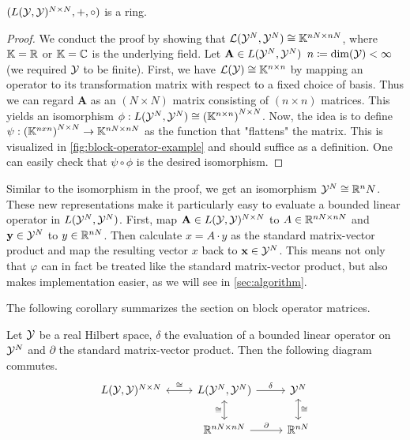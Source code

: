 \begin{theorem}
	\label{theo:product-space-ring}
	$(L(\mathcal{Y}, \mathcal{Y})^{N\times N}, +, \circ)$ is a  ring.
\end{theorem}
\begin{proof}
	We conduct the proof by showing that $\mathcal{L}(\mathcal{Y}^N, \mathcal{Y}^N) \cong \mathbb{K}^{nN \times nN}$, where $\mathbb{K} = \mathbb{R}$ or $\mathbb{K} = \mathbb{C}$ is the underlying field.
	Let $\mathbf{A} \in L(\mathcal{Y}^N, \mathcal{Y}^N)$ $n \coloneqq \mathrm{dim}(\mathcal{Y}) < \infty$ (we required $\mathcal{Y}$ to be finite).
	First, we have $\mathcal{L}(\mathcal{Y}) \cong \mathbb{K}^{n\times n}$ by mapping an operator to its transformation matrix with respect to a fixed choice of basis.
	Thus we can regard $\mathbf{A}$ as an $(N \times N)$ matrix consisting of $(n \times n)$ matrices.
	This yields an isomorphism $\phi: L(\mathcal{Y}^N, \mathcal{Y}^N) \cong \left(\mathbb{K}^{n\times n}\right)^{N \times N}$.
	Now, the idea is to define $\psi:\left(\mathbb{K}^{nxn}\right)^{N \times N} \rightarrow \mathbb{K}^{nN \times nN}$ as the function that "flattens" the matrix.
	This is visualized in \cref{fig:block-operator-example} and should suffice as a definition.
	One can easily check that $\psi \circ \phi$ is the desired isomorphism.
\end{proof}



Similar to the isomorphism in the proof, we get an isomorphism $\mathcal{Y}^N \cong \mathbb{R}^nN$.
These new representations make it particularly easy to evaluate a bounded linear operator in $L(\mathcal{Y}^N, \mathcal{Y}^N)$.
First, map $\mathbf{A} \in L(\mathcal{Y}, \mathcal{Y})^{N\times N}$ to $A \in \mathbb{R}^{nN \times nN}$ and $\mathbf{y} \in \mathcal{Y}^N$ to $y \in \mathbb{R}^{nN}$.
Then calculate $x = A \cdot y$ as the standard matrix-vector product and map the resulting vector $x$ back to $\mathbf{x} \in \mathcal{Y}^N$.
This means not only that $\varphi$ can in fact be treated like the standard matrix-vector product, but also makes implementation easier, as we will see in \cref{sec:algorithm}.

The following corollary summarizes the section on block operator matrices.
\begin{corollary}
	\label{cor:matrix-vector-equivalence}
	\label{cor:matrix-ring-equivalence}
	Let $\mathcal{Y}$ be a real Hilbert space, $\delta$ the evaluation of a bounded linear operator on $\mathcal{Y}^N$ and $\partial$ the standard matrix-vector product. Then the following diagram commutes.
	\begin{equation}
		\begin{tikzcd}
		 	L(\cY, \cY)^{N\times N} \arrow[leftrightarrow]{r}{\cong} &L(\cY^N, \cY^N) \arrow{r}{\delta} \arrow[swap, leftrightarrow]{d}{\cong} & \cY^N \arrow[leftrightarrow]{d}{\cong} \\%
			&\R^{nN \times nN} \arrow{r}{\partial}& \R^{nN}
		\end{tikzcd}
	\end{equation}
\end{corollary}